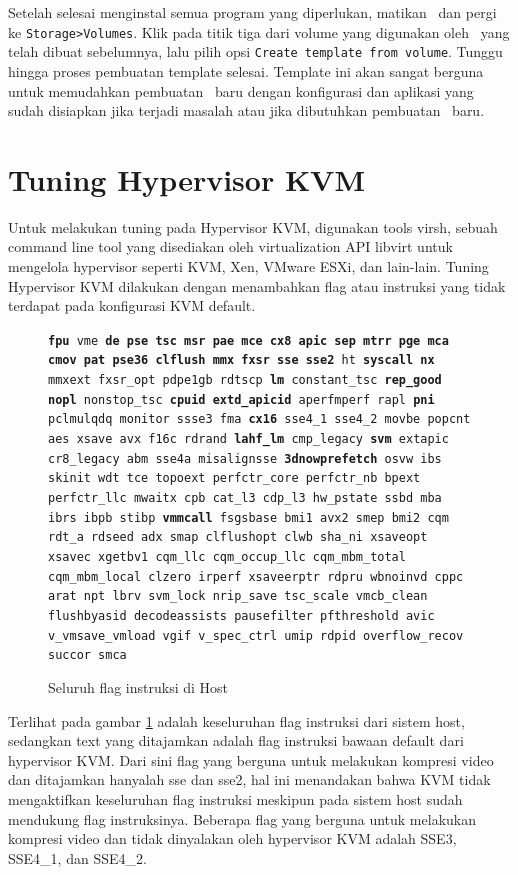 Setelah selesai menginstal semua program yang diperlukan, matikan \vm\ dan pergi ke \texttt{Storage>Volumes}. Klik pada titik tiga dari volume yang digunakan oleh \vm\ yang telah dibuat sebelumnya, lalu pilih opsi \texttt{Create template from volume}. Tunggu hingga proses pembuatan template selesai. Template ini akan sangat berguna untuk memudahkan pembuatan \vm\ baru dengan konfigurasi dan aplikasi yang sudah disiapkan jika terjadi masalah atau jika dibutuhkan pembuatan \vm\ baru.

\section{Tuning Hypervisor KVM}
Untuk melakukan tuning pada Hypervisor KVM, digunakan tools virsh, sebuah command line tool yang disediakan oleh virtualization API libvirt untuk mengelola hypervisor seperti KVM, Xen, VMware ESXi, dan lain-lain. Tuning Hypervisor KVM dilakukan dengan menambahkan flag atau instruksi yang tidak terdapat pada konfigurasi KVM default.

\begin{figure}
    \texttt{\textbf{fpu} vme \textbf{de pse tsc msr pae mce cx8 apic sep mtrr pge mca cmov pat pse36 clflush mmx fxsr sse sse2} ht \textbf{syscall nx} mmxext fxsr\_opt pdpe1gb rdtscp \textbf{lm} constant\_tsc \textbf{rep\_good} \textbf{nopl} nonstop\_tsc \textbf{cpuid extd\_apicid} aperfmperf rapl \textbf{pni} pclmulqdq monitor ssse3 fma \textbf{cx16} sse4\_1 sse4\_2 movbe popcnt aes xsave avx f16c rdrand \textbf{lahf\_lm} cmp\_legacy \textbf{svm} extapic cr8\_legacy abm sse4a misalignsse \textbf{3dnowprefetch} osvw ibs skinit wdt tce topoext perfctr\_core perfctr\_nb bpext perfctr\_llc mwaitx cpb cat\_l3 cdp\_l3 hw\_pstate ssbd mba ibrs ibpb stibp \textbf{vmmcall} fsgsbase bmi1 avx2 smep bmi2 cqm rdt\_a rdseed adx smap clflushopt clwb sha\_ni xsaveopt xsavec xgetbv1 cqm\_llc cqm\_occup\_llc cqm\_mbm\_total cqm\_mbm\_local clzero irperf xsaveerptr rdpru wbnoinvd cppc arat npt lbrv svm\_lock nrip\_save tsc\_scale vmcb\_clean flushbyasid decodeassists pausefilter pfthreshold avic v\_vmsave\_vmload vgif v\_spec\_ctrl umip rdpid overflow\_recov succor smca}
    \caption{Seluruh flag instruksi di Host}
    \label{fig:flag_kvm_host}
\end{figure}

Terlihat pada gambar \ref{fig:flag_kvm_host} adalah keseluruhan flag instruksi dari sistem host, sedangkan text yang ditajamkan adalah flag instruksi bawaan default dari hypervisor KVM. Dari sini flag yang berguna untuk melakukan kompresi video dan ditajamkan hanyalah sse dan sse2, hal ini menandakan bahwa KVM tidak mengaktifkan keseluruhan flag instruksi meskipun pada sistem host sudah mendukung flag instruksinya. Beberapa flag yang berguna untuk melakukan kompresi video dan tidak dinyalakan oleh hypervisor KVM adalah SSE3, SSE4\_1, dan SSE4\_2. 


